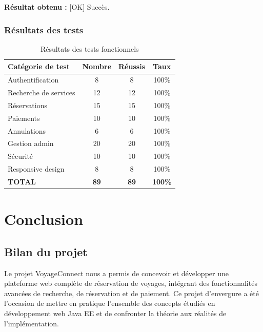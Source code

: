 \documentclass[12pt,a4paper]{report}
\begin{document}
\textbf{Résultat obtenu :} [OK] Succès.

\subsection{Résultats des tests}

\begin{table}[H]
\centering
\caption{Résultats des tests fonctionnels}
\label{tab:resultats-tests}
\small
\begin{tabular}{|l|c|c|c|}
\hline
\textbf{Catégorie de test} & \textbf{Nombre} & \textbf{Réussis} & \textbf{Taux} \\
\hline
Authentification & 8 & 8 & 100\% \\
\hline
Recherche de services & 12 & 12 & 100\% \\
\hline
Réservations & 15 & 15 & 100\% \\
\hline
Paiements & 10 & 10 & 100\% \\
\hline
Annulations & 6 & 6 & 100\% \\
\hline
Gestion admin & 20 & 20 & 100\% \\
\hline
Sécurité & 10 & 10 & 100\% \\
\hline
Responsive design & 8 & 8 & 100\% \\
\hline
\textbf{TOTAL} & \textbf{89} & \textbf{89} & \textbf{100\%} \\
\hline
\end{tabular}
\end{table}

\clearpage




\chapter*{Conclusion}

\section*{Bilan du projet}

Le projet VoyageConnect nous a permis de concevoir et développer une plateforme web complète de réservation de voyages, intégrant des fonctionnalités avancées de recherche, de réservation et de paiement. Ce projet d'envergure a été l'occasion de mettre en pratique l'ensemble des concepts étudiés en développement web Java EE et de confronter la théorie aux réalités de l'implémentation.
\end{document}
